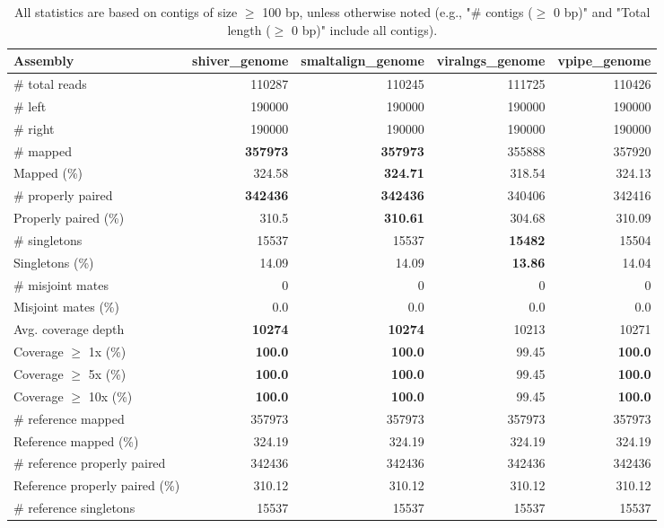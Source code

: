 \documentclass[12pt,a4paper]{article}
\begin{document}
\begin{table}[ht]
\begin{center}
\caption{All statistics are based on contigs of size $\geq$ 100 bp, unless otherwise noted (e.g., "\# contigs ($\geq$ 0 bp)" and "Total length ($\geq$ 0 bp)" include all contigs).}
\begin{tabular}{|l*{4}{|r}|}
\hline
Assembly & shiver\_genome & smaltalign\_genome & viralngs\_genome & vpipe\_genome \\ \hline
\# total reads & 110287 & 110245 & 111725 & 110426 \\ \hline
\# left & 190000 & 190000 & 190000 & 190000 \\ \hline
\# right & 190000 & 190000 & 190000 & 190000 \\ \hline
\# mapped & {\bf 357973} & {\bf 357973} & 355888 & 357920 \\ \hline
Mapped (\%) & 324.58 & {\bf 324.71} & 318.54 & 324.13 \\ \hline
\# properly paired & {\bf 342436} & {\bf 342436} & 340406 & 342416 \\ \hline
Properly paired (\%) & 310.5 & {\bf 310.61} & 304.68 & 310.09 \\ \hline
\# singletons & 15537 & 15537 & {\bf 15482} & 15504 \\ \hline
Singletons (\%) & 14.09 & 14.09 & {\bf 13.86} & 14.04 \\ \hline
\# misjoint mates & 0 & 0 & 0 & 0 \\ \hline
Misjoint mates (\%) & 0.0 & 0.0 & 0.0 & 0.0 \\ \hline
Avg. coverage depth & {\bf 10274} & {\bf 10274} & 10213 & 10271 \\ \hline
Coverage $\geq$ 1x (\%) & {\bf 100.0} & {\bf 100.0} & 99.45 & {\bf 100.0} \\ \hline
Coverage $\geq$ 5x (\%) & {\bf 100.0} & {\bf 100.0} & 99.45 & {\bf 100.0} \\ \hline
Coverage $\geq$ 10x (\%) & {\bf 100.0} & {\bf 100.0} & 99.45 & {\bf 100.0} \\ \hline
\# reference mapped & 357973 & 357973 & 357973 & 357973 \\ \hline
Reference mapped (\%) & 324.19 & 324.19 & 324.19 & 324.19 \\ \hline
\# reference properly paired & 342436 & 342436 & 342436 & 342436 \\ \hline
Reference properly paired (\%) & 310.12 & 310.12 & 310.12 & 310.12 \\ \hline
\# reference singletons & 15537 & 15537 & 15537 & 15537 \\ \hline

\end{tabular}
\end{center}
\end{table}
\end{document}
